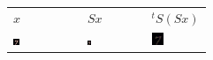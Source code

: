 \begin{tabular}{l c c c l c c c l}
$x$ & & & & $Sx$ & & & & $^tS(Sx)$
\\

\includegraphics[width=0.25\textwidth]{resultats/compare_filter/seed21-x.png}
& & & &
\includegraphics[width=0.25\textwidth]{resultats/compare_filter/seed21-Ax-filtre=s.png}
& & & &
\includegraphics[width=0.25\textwidth]{resultats/compare_filter/seed21-tA(Ax)-filtre=s.png}\end{tabular}